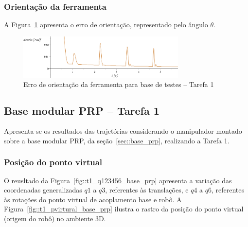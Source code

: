 \subsubsection{Orientação da ferramenta}

A Figura~\ref{fig::t1_erroori_base_testes} apresenta o erro de orientação,
representado pelo ângulo $\theta$.

\begin{figure}[h!]
	\centering 
 	\includegraphics[width=0.75\textwidth]{figs/t1_erroori_base_testes}
 	\caption{Erro de orientação da ferramenta para base de testes -- Tarefa
 	1}
 	\label{fig::t1_erroori_base_testes}
\end{figure}

\clearpage
\subsection{Base modular PRP -- Tarefa 1} \label{sec::res_prp}

Apresenta-se os resultados das trajetórias considerando o manipulador montado
sobre a base modular PRP, da seção~\ref{sec::base_prp}, realizando a Tarefa 1.

\subsubsection{Posição do ponto virtual}

O reusltado da Figura~\ref{fig::t1_q123456_base_prp} apresenta a variação das
coordenadas generalizadas $q1$ a $q3$, referentes às translações, e $q4$ a $q6$,
referentes às rotações do ponto virtual de acoplamento base e robô. A
Figura~\ref{fig::t1_pvirtural_base_prp} ilustra o rastro da posição do ponto
virtual (origem do robô) no ambiente 3D.

